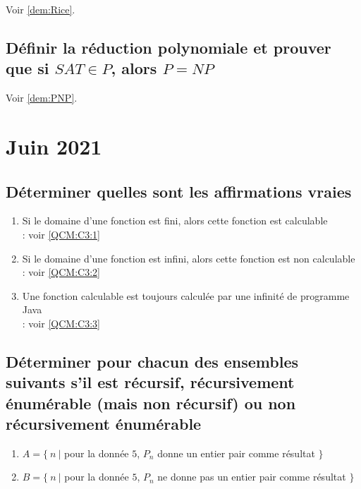 Voir \ref{dem:Rice}.

\subsection*{Définir la réduction polynomiale et prouver que si $SAT \in P$, alors $P = NP$}

Voir \ref{dem:PNP}.

\section{Juin 2021}

\subsection*{Déterminer quelles sont les affirmations vraies}

\begin{enumerate}
\item Si le domaine d'une fonction est fini, alors cette fonction est calculable\\
	 : voir \ref{QCM:C3:1}
\item Si le domaine d'une fonction est infini, alors cette fonction est non calculable\\
	 : voir \ref{QCM:C3:2}
\item Une fonction calculable est toujours calculée par une infinité de programme Java\\
	 : voir \ref{QCM:C3:3}
\end{enumerate}

\subsection*{Déterminer pour chacun des ensembles suivants s'il est récursif, récursivement énumérable (mais non récursif) ou non récursivement énumérable}

\begin{enumerate}
\item $A = \{\ n\ |$ pour la donnée $5$, $P_n$ donne un entier pair comme résultat $\}$\\
\item $B = \{\ n\ |$ pour la donnée $5$, $P_n$ ne donne pas un entier pair comme résultat $\}$\\
\end{enumerate}

